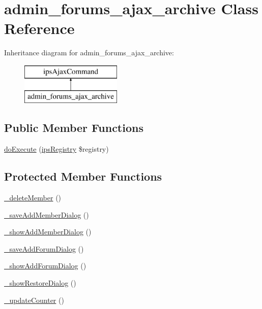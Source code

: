 \hypertarget{classadmin__forums__ajax__archive}{\section{admin\-\_\-forums\-\_\-ajax\-\_\-archive Class Reference}
\label{classadmin__forums__ajax__archive}
}
Inheritance diagram for admin\-\_\-forums\-\_\-ajax\-\_\-archive\-:\begin{figure}[H]
\begin{center}
\leavevmode
\includegraphics[height=2.000000cm]{classadmin__forums__ajax__archive}
\end{center}
\end{figure}
\subsection*{Public Member Functions}
\begin{DoxyCompactItemize}
\item 
\hyperlink{classadmin__forums__ajax__archive_afbc4e912a0604b94d47d66744c64d8ba}{do\-Execute} (\hyperlink{classips_registry}{ips\-Registry} \$registry)
\end{DoxyCompactItemize}
\subsection*{Protected Member Functions}
\begin{DoxyCompactItemize}
\item 
\hyperlink{classadmin__forums__ajax__archive_ac2fd7801c774fc12f75db0fdf830f040}{\-\_\-delete\-Member} ()
\item 
\hyperlink{classadmin__forums__ajax__archive_a1fc7e596dabaa9597724a9c12c58c3d5}{\-\_\-save\-Add\-Member\-Dialog} ()
\item 
\hyperlink{classadmin__forums__ajax__archive_a038d6a81c3e7b7efa8d52ec7d2d9f947}{\-\_\-show\-Add\-Member\-Dialog} ()
\item 
\hyperlink{classadmin__forums__ajax__archive_acfc12c7f70426e822c6ec480ee954a9a}{\-\_\-save\-Add\-Forum\-Dialog} ()
\item 
\hyperlink{classadmin__forums__ajax__archive_adaa5f399d63037d46e49c748c7d488ca}{\-\_\-show\-Add\-Forum\-Dialog} ()
\item 
\hyperlink{classadmin__forums__ajax__archive_ae5ad19922b1e9600080843c365e1c5ab}{\-\_\-show\-Restore\-Dialog} ()
\item 
\hyperlink{classadmin__forums__ajax__archive_a2f492c54d86022d111bf6e9347c1811b}{\-\_\-update\-Counter} ()
\end{DoxyCompactItemize}
